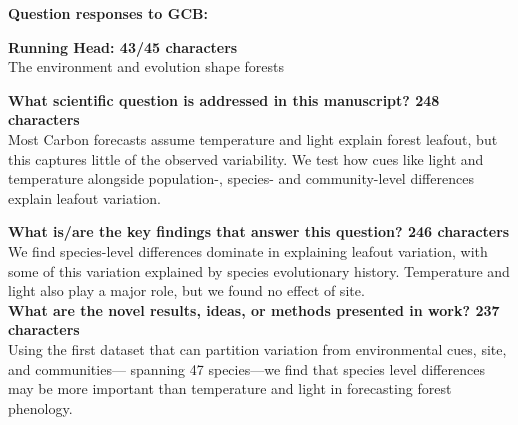 \documentclass{letter}
\begin{document}
\textbf{Question responses to GCB:}


\textbf{Running Head: 43/45 characters}\\

The environment and evolution shape forests 


\textbf{What scientific question is addressed in this manuscript? 248 characters}\\


Most Carbon forecasts assume temperature and light explain forest leafout, but this captures little of the observed variability. We test how cues like light and temperature alongside population-, species- and community-level differences explain leafout variation. 

\textbf{What is/are the key findings that answer this question? 246 characters}\\


We find species-level differences dominate in explaining leafout variation, with some of this variation explained by species evolutionary history. Temperature and light also play a major role, but we found no effect of site.  \\

\textbf{What are the novel results, ideas, or methods presented in work? 237 characters}\\
Using the first dataset that can partition variation from environmental cues, site, and communities--- spanning 47 species---we find that species level differences may be more important than temperature and light in forecasting forest phenology. \\
\end{document}
